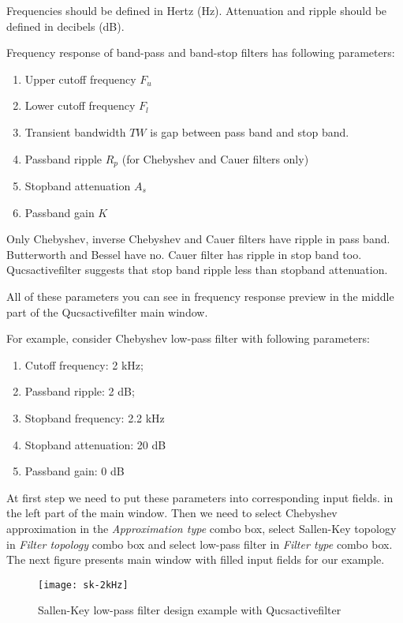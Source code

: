Frequencies should be defined in Hertz (Hz). Attenuation and ripple should
be defined in decibels (dB).

Frequency response of band-pass and band-stop filters has following
parameters:

\begin{enumerate}
 \item Upper cutoff frequency $F_u$
 \item Lower cutoff frequency $F_l$
 \item Transient bandwidth $TW$ is gap between pass band and stop band.
 \item Passband ripple $R_p$ (for Chebyshev and Cauer filters only)
 \item Stopband attenuation $A_s$
 \item Passband gain $K$
\end{enumerate}

Only Chebyshev, inverse Chebyshev and Cauer filters have ripple in pass band.
Butterworth and Bessel have no. Cauer filter has ripple in stop band too.
Qucsactivefilter suggests that stop band ripple less than stopband attenuation.

All of these parameters you can see in frequency response preview in the middle
part of the Qucsactivefilter main window.


For example, consider Chebyshev low-pass filter with following parameters:

\begin{enumerate}
 \item Cutoff frequency: 2 kHz;
 \item Passband ripple: 2 dB;
 \item Stopband frequency: 2.2 kHz
 \item Stopband attenuation: 20 dB
 \item Passband gain: 0 dB
\end{enumerate}

At first step we need to put these parameters into corresponding input fields.
in the left part of the main window. Then we need to select Chebyshev
approximation in the \emph{Approximation type} combo box, select Sallen-Key
topology in \emph{Filter topology} combo box and select low-pass filter in
\emph{Filter type} combo box. The next figure presents main window with filled
input fields for our example.

\begin{figure}[ht]
  \centering
  \texttt{[image: sk-2kHz]}
  \caption{Sallen-Key low-pass filter design example with Qucsactivefilter}
  \label{fig:sk2kHz}
\end{figure}
\FloatBarrier

